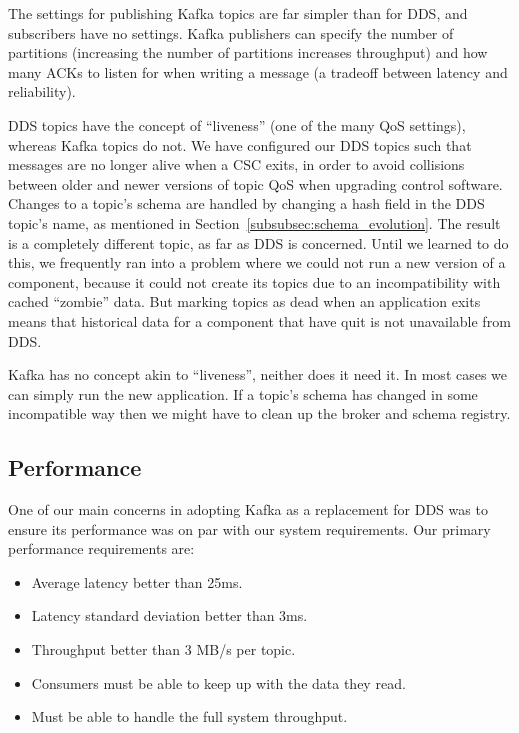 \documentclass[]{spie}  %
\begin{document}
The settings for publishing Kafka topics are far simpler than for DDS, and subscribers have no settings.
Kafka publishers can specify the number of partitions (increasing the number of partitions increases throughput) and how many ACKs to listen for when writing a message (a tradeoff between latency and reliability).

DDS topics have the concept of “liveness” (one of the many QoS settings), whereas Kafka topics do not.
We have configured our DDS topics such that messages are no longer alive when a CSC exits, in order to avoid collisions between older and newer versions of topic QoS when upgrading control software.
Changes to a topic’s schema are handled by changing a hash field in the DDS topic’s name, as mentioned in Section~\ref{subsubsec:schema_evolution}.
The result is a completely different topic, as far as DDS is concerned.
Until we learned to do this, we frequently ran into a problem where we could not run a new version of a component, because it could not create its topics due to an incompatibility with cached “zombie” data.
But marking topics as dead when an application exits means that historical data for a component that have quit is not unavailable from DDS.

Kafka has no concept akin to “liveness”, neither does it need it.
In most cases we can simply run the new application.
If a topic’s schema has changed in some incompatible way then we might have to clean up the broker and schema registry.

\subsection{Performance}
\label{subsec:performance}

One of our main concerns in adopting Kafka as a replacement for DDS was to ensure its performance was on par with our system requirements.
Our primary performance requirements are:

\begin{itemize}
  \item Average latency better than 25ms.
  \item Latency standard deviation better than 3ms.
  \item Throughput better than 3 MB/s per topic.
  \item Consumers must be able to keep up with the data they read.
  \item Must be able to handle the full system throughput.
\end{itemize}
\end{document}
